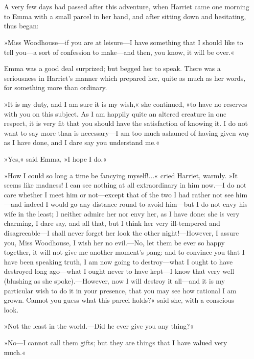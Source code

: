 \chapter[Chapter \thechapter]{}
\lettrine[lines=4,lraise=0.3]{A}{}  very few days had passed after this adventure, when Harriet came one morning to Emma with a small parcel in her hand, and after sitting down and hesitating, thus began:

»Miss Woodhouse—if you are at leisure—I have something that I should like to tell you—a sort of confession to make—and then, you know, it will be over.«

Emma was a good deal surprized; but begged her to speak. There was a seriousness in Harriet's manner which prepared her, quite as much as her words, for something more than ordinary.

»It is my duty, and I am sure it is my wish,« she continued, »to have no reserves with you on this subject. As I am happily quite an altered creature in one respect, it is very fit that you should have the satisfaction of knowing it. I do not want to say more than is necessary—I am too much ashamed of having given way as I have done, and I dare say you understand me.«

»Yes,« said Emma, »I hope I do.«

»How I could so long a time be fancying myself!...« cried Harriet, warmly. »It seems like madness! I can see nothing at all extraordinary in him now.—I do not care whether I meet him or not—except that of the two I had rather not see him—and indeed I would go any distance round to avoid him—but I do not envy his wife in the least; I neither admire her nor envy her, as I have done: she is very charming, I dare say, and all that, but I think her very ill-tempered and disagreeable—I shall never forget her look the other night!—However, I assure you, Miss Woodhouse, I wish her no evil.—No, let them be ever so happy together, it will not give me another moment's pang: and to convince you that I have been speaking truth, I am now going to destroy—what I ought to have destroyed long ago—what I ought never to have kept—I know that very well (blushing as she spoke).—However, now I will destroy it all—and it is my particular wish to do it in your presence, that you may see how rational I am grown. Cannot you guess what this parcel holds?« said she, with a conscious look.

»Not the least in the world.—Did he ever give you any thing?«

»No—I cannot call them gifts; but they are things that I have valued very much.«

